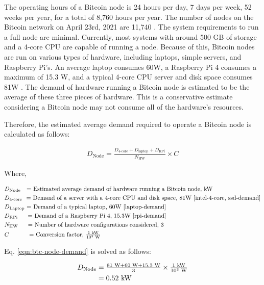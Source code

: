The operating hours of a Bitcoin node is 24 hours per day, 7 days per week, 52 weeks per year, for a total of 8,760 hours per year.
The number of nodes on the Bitcoin network on April 23rd, 2021 are 11,740 \cite{btc-moody-dash}.
The system requirements to run a full node are minimal.
Currently, most systems with around 500 GB of storage and a 4-core CPU are capable of running a node.
Because of this, Bitcoin nodes are run on various types of hardware, including laptops, simple servers, and Raspberry Pi's.
An average laptop consumes 60W, a Raspberry Pi 4 consumes a maximum of 15.3 W, and a typical 4-core CPU server and disk space consumes 81W \cite{laptop-demand, rpi-demand, intel-4-core, ssd-demand}.
The demand of hardware running a Bitcoin node is estimated to be the average of these three pieces of hardware.
This is a conservative estimate considering a Bitcoin node may not consume all of the hardware's resources.

Therefore, the estimated average demand required to operate a Bitcoin node is calculated as follows:

\begin{align}\label{eqn:btc-node-demand}
  D_\textrm{Node} = \frac{D_\textrm{4-core} + D_\textrm{laptop} + D_\textrm{RPi}} {N_\textrm{HW}} \times C
\end{align}

\noindent
Where,

\begin{align*}
&D_\textrm{Node}    \textrm{ \ \            = Estimated average demand of hardware running a Bitcoin node, kW} \\
&D_\textrm{4-core}  \textrm{ \              = Demand of a server with a 4-core CPU and disk space, 81W \cite{intel-4-core, ssd-demand}} \\
&D_\textrm{Laptop}  \textrm{                = Demand of a typical laptop, 60W \cite{laptop-demand}} \\
&D_\textrm{RPi}     \textrm{ \quad \        = Demand of a Raspberry Pi 4, 15.3W \cite{rpi-demand}} \\
&N_\textrm{HW}      \textrm{ \quad \        = Number of hardware configurations considered, 3} \\
&C                  \textrm{\qquad \quad \  = Conversion factor, $\tfrac{1 \textrm{ kW} } { 10^3 \textrm{ W}}$}
\end{align*}

Eq. \eqref{eqn:btc-node-demand} is solved as follows:

\begin{align}\label{eqn:btc-node-demand-res}
D_\textrm{Node} &= \tfrac{81 \textrm{ W} + 60 \textrm{ W} + 15.3 \textrm{ W}} { 3 }  \times \tfrac{1 \textrm{ kW} } { 10^3 \textrm{ W}} \nonumber \\
&= 0.52  \textrm{ kW}
\end{align}

